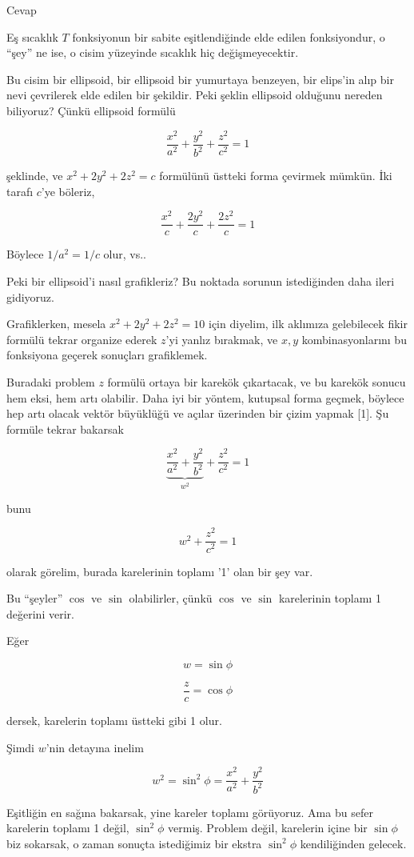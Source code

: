 \documentclass[12pt,fleqn]{article}\usepackage{../../common}
\begin{document}
Cevap 

Eş sıcaklık $T$ fonksiyonun bir sabite eşitlendiğinde elde edilen
fonksiyondur, o ``şey'' ne ise, o cisim yüzeyinde sıcaklık hiç
değişmeyecektir. 

Bu cisim bir ellipsoid, bir ellipsoid bir yumurtaya benzeyen, bir elips'in
alıp bir nevi çevrilerek elde edilen bir şekildir. Peki şeklin ellipsoid
olduğunu nereden biliyoruz? Çünkü ellipsoid formülü

$$ \frac{x^2}{a^2} +  \frac{y^2}{b^2} + \frac{z^2}{c^2}  = 1  $$

şeklinde, ve $x^2 + 2y^2 + 2z^2 = c$ formülünü üstteki forma çevirmek
mümkün. İki tarafı $c$'ye böleriz,

$$ \frac{x^2}{c} +  \frac{2y^2}{c} + \frac{2z^2}{c}  = 1  $$

Böylece $1/a^2 = 1/c$ olur, vs.. 

Peki bir ellipsoid'i nasıl grafikleriz? Bu noktada sorunun istediğinden
daha ileri gidiyoruz. 

Grafiklerken, mesela $x^2 + 2y^2 + 2z^2 = 10$ için diyelim, ilk aklımıza
gelebilecek fikir formülü tekrar organize ederek $z$'yi yanlız bırakmak, ve
$x,y$ kombinasyonlarını bu fonksiyona geçerek sonuçları grafiklemek. 

Buradaki problem $z$ formülü ortaya bir karekök çıkartacak, ve bu karekök
sonucu hem eksi, hem artı olabilir. Daha iyi bir yöntem, kutupsal forma
geçmek, böylece hep artı olacak vektör büyüklüğü ve açılar üzerinden bir
çizim yapmak [1]. Şu formüle tekrar bakarsak

$$ \underbrace{\frac{x^2}{a^2} +  \frac{y^2}{b^2}}_{w^2}
 + \frac{z^2}{c^2}  = 1  $$

bunu

$$ w^2 + \frac{z^2}{c^2}  = 1  $$

olarak görelim, burada karelerinin toplamı '1' olan bir şey var. 

Bu ``şeyler'' $\cos$ ve $\sin$ olabilirler, çünkü $\cos$ ve $\sin$ karelerinin
toplamı 1 değerini verir.

Eğer

$$ w = \sin \phi $$

$$ \frac{z}{c} = \cos \phi $$

dersek, karelerin toplamı üstteki gibi 1 olur. 

Şimdi $w$'nin detayına inelim

$$ w^2 = \sin^2\phi = \frac{x^2}{a^2} +  \frac{y^2}{b^2}  $$

Eşitliğin en sağına bakarsak, yine kareler toplamı görüyoruz. Ama bu sefer
karelerin toplamı 1 değil, $\sin^2\phi$ vermiş. Problem değil, karelerin
içine bir $\sin \phi$ biz sokarsak, o zaman sonuçta istediğimiz bir
ekstra $\sin^2\phi$ kendiliğinden gelecek. 
\end{document}
